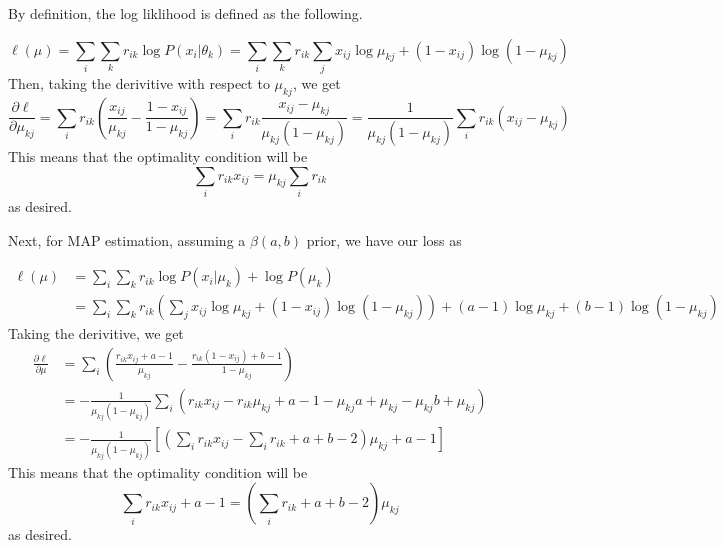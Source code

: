 \documentclass[12pt,letterpaper,fleqn]{hmcpset}
\begin{document}
\begin{solution}
By definition, the log liklihood is defined as the following.

$$\ell(\mu) = \sum_{i} \sum_{k} r_{ik} \log P(x_i|\theta_k)
= \sum_{i} \sum_{k} r_{ik} \sum_{j} x_{ij}\log \mu_{kj} + (1 - x_{ij}) \log(1 - \mu_{kj})$$
Then, taking the derivitive with respect to $\mu_{kj}$, we get
$$
\frac{\partial \ell}{\partial \mu_{kj}} = \sum_{i} r_{ik} \left( \frac{x_{ij}}{\mu_{kj}} - \frac{1 - x_{ij}}{1 - \mu_{kj}} \right)
= \sum_{i} r_{ik} \frac{x_{ij} - \mu_{kj}}{\mu_{kj}(1 - \mu_{kj})}
= \frac{1}{\mu_{kj}(1 - \mu_{kj})} \sum_{i} r_{ik} (x_{ij} - \mu_{kj})
$$
This means that the optimality condition will be
$$
\sum_{i} r_{ik}x_{ij} = \mu_{kj} \sum_{i} r_{ik}
$$
as desired.

Next, for MAP estimation, assuming a $\beta(a,b)$ prior, we have our loss as

\begin{align*}
	\ell(\mu) &= \sum_{i} \sum_{k} r_{ik} \log P(x_i|\mu_k) + \log P(\mu_k)\\
	&= \sum_{i} \sum_{k} r_{ik} \left( \sum_{j} x_{ij} \log \mu_{kj} + (1 - x_{ij}) \log(1 - \mu_{kj}) \right) + (a - 1) \log \mu_{kj} + (b - 1) \log(1 - \mu_{kj})
\end{align*}
Taking the derivitive, we get
\begin{align*}
	\frac{\partial \ell}{\partial \mu} &= \sum_{i} \left( \frac{r_{ik}x_{ij} + a - 1}{\mu_{kj}} - \frac{r_{ik}(1 - x_{ij}) + b - 1}{1 - \mu_{kj}} \right)\\
&= - \frac{1}{\mu_{kj}(1 - \mu_{kj})} \sum_{i} \left( r_{ik}x_{ij} - r_{ik}\mu_{kj} + a - 1 - \mu_{kj}a + \mu_{kj} - \mu_{kj}b + \mu_{kj} \right)\\
&= - \frac{1}{\mu_{kj}(1 - \mu_{kj})} \left[ \left( \sum_{i} r_{ik}x_{ij} - \sum_{i} r_{ik} + a + b - 2 \right) \mu_{kj} + a - 1 \right]
\end{align*}
This means that the optimality condition will be
$$
\sum_{i} r_{ik}x_{ij} + a - 1 = \left( \sum_{i} r_{ik} + a + b - 2 \right) \mu_{kj}
$$
as desired.
\end{solution}
\newpage
\end{document}
